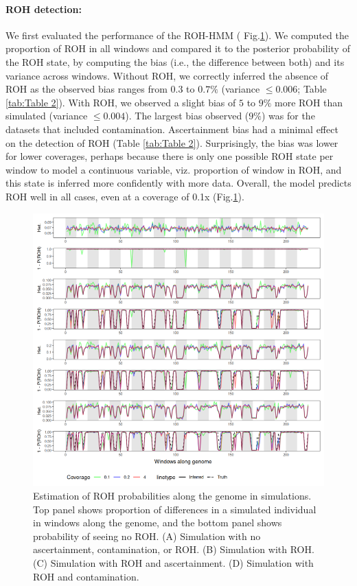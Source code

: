 \documentclass[12pt, letterpaper]{article}
\begin{document}
\paragraph{ROH detection:}
We first evaluated the performance of the ROH-HMM ( Fig.\ref{fig2:ROH}). We computed the proportion of ROH in all windows and compared it to the posterior probability of the ROH state, by computing the bias (i.e., the difference between both) and its variance across windows. Without ROH, we correctly inferred the absence of ROH as the observed bias ranges from $0.3$ to $0.7\%$ (variance $\leq0.006$; Table \ref{tab:Table 2}). With ROH, we observed a slight bias of $5$ to $9\%$ more ROH than simulated (variance $\leq0.004$). The largest bias observed ($9\%$) was for the datasets that included contamination. Ascertainment bias had a minimal effect on the detection of ROH (Table \ref{tab:Table 2}). Surprisingly, the bias was lower for lower coverages, perhaps because there is only one possible ROH state per window to model a continuous variable, viz. proportion of window in ROH, and this state is inferred more confidently with more data. Overall, the model predicts ROH well in all cases, even at a coverage of 0.1x (Fig.\ref{fig2:ROH}).


\begin{figure}[h!]
    \includegraphics[width=16cm]{plots/inkscape_finalImg/ROHplot.png}
    \centering
    \caption{Estimation of ROH probabilities along the genome in simulations. Top panel shows proportion of differences in a simulated individual in windows along the genome, and the bottom panel shows probability of seeing no ROH. (A) Simulation with no ascertainment, contamination, or ROH. (B) Simulation with ROH. (C) Simulation with ROH and ascertainment. (D) Simulation with ROH and contamination.}
    \label{fig2:ROH}
\end{figure}
\end{document}
